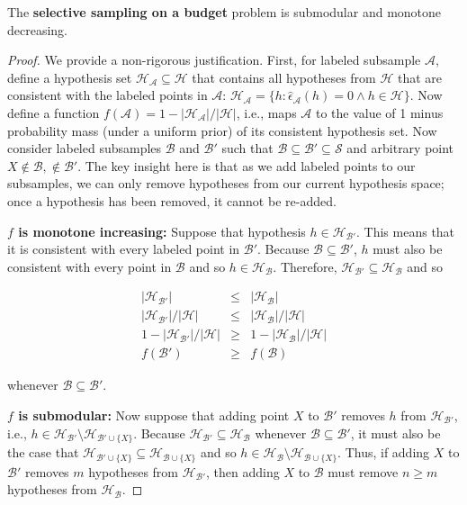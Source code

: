 \begin{lemma}
The \textbf{selective sampling on a budget} problem is submodular and monotone decreasing.
\end{lemma}
\begin{proof}
We provide a non-rigorous justification. First, for labeled subsample $\mathcal{A}$, define a hypothesis set $\mathcal{H}_{\mathcal{A}} \subseteq \mathcal{H}$ that contains all hypotheses from $\mathcal{H}$ that are consistent with the labeled points in $\mathcal{A}$: $\mathcal{H}_{\mathcal{A}} = \{h : \hat{\epsilon}_{\mathcal{A}}(h)=0 \wedge h \in \mathcal{H}\}$. Now define a function $f(\mathcal{A}) = 1-|\mathcal{H}_{\mathcal{A}}| / |\mathcal{H}|$, i.e., maps $\mathcal{A}$ to the value of 1 minus probability mass (under a uniform prior) of its consistent hypothesis set. Now consider labeled subsamples $\mathcal{B}$ and $\mathcal{B}'$ such that $\mathcal{B} \subseteq \mathcal{B}' \subseteq \mathcal{S}$ and arbitrary point $X \not\in \mathcal{B}, \not\in \mathcal{B}'$. The key insight here is that as we add labeled points to our subsamples, we can only remove hypotheses from our current hypothesis space; once a hypothesis has been removed, it cannot be re-added.

\textbf{$f$ is monotone increasing:} Suppose that hypothesis $h \in \mathcal{H}_{\mathcal{B}'}$. This means that it is consistent with every labeled point in $\mathcal{B}'$. Because $\mathcal{B} \subseteq \mathcal{B}'$, $h$ must also be consistent with every point in $\mathcal{B}$ and so $h \in \mathcal{H}_{\mathcal{B}}$. Therefore, $\mathcal{H}_{\mathcal{B}'} \subseteq \mathcal{H}_{\mathcal{B}}$ and so

\begin{eqnarray*}
|\mathcal{H}_{\mathcal{B}'}| &\leq& |\mathcal{H}_{\mathcal{B}}| \\
|\mathcal{H}_{\mathcal{B}'}| / |\mathcal{H}| &\leq& |\mathcal{H}_{\mathcal{B}}| / |\mathcal{H}| \\
1-|\mathcal{H}_{\mathcal{B}'}| / |\mathcal{H}| &\geq& 1-|\mathcal{H}_{\mathcal{B}}| / |\mathcal{H}| \\
f(\mathcal{B}') &\geq& f(\mathcal{B})
\end{eqnarray*}

\noindent whenever $\mathcal{B} \subseteq \mathcal{B}'$.

\textbf{$f$ is submodular:} Now suppose that adding point $X$ to $\mathcal{B}'$ removes $h$ from $\mathcal{H}_{\mathcal{B}'}$, i.e., $h \in \mathcal{H}_{\mathcal{B}'} \setminus \mathcal{H}_{\mathcal{B}' \cup \{X\}}$. Because $\mathcal{H}_{\mathcal{B}'} \subseteq \mathcal{H}_{\mathcal{B}}$ whenever $\mathcal{B} \subseteq \mathcal{B}'$, it must also be the case that $\mathcal{H}_{\mathcal{B}' \cup \{X\}} \subseteq \mathcal{H}_{\mathcal{B} \cup \{X\}}$ and so $h \in \mathcal{H}_{\mathcal{B}} \setminus \mathcal{H}_{\mathcal{B} \cup \{X\}}$. Thus, if adding $X$ to $\mathcal{B}'$ removes $m$ hypotheses from $\mathcal{H}_{\mathcal{B}'}$, then adding $X$ to $\mathcal{B}$ must remove $n \geq m$ hypotheses from $\mathcal{H}_{\mathcal{B}}$.


\end{proof}
